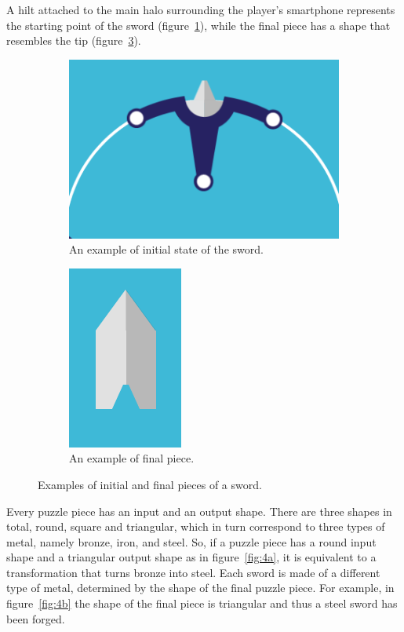 A hilt attached to the main halo surrounding the player’s smartphone represents the starting point of the sword (figure~\ref{fig:3a}), while the final piece has a shape that resembles the tip (figure~\ref{fig:3b}).

\begin{figure}[ht!] 
  \begin{subfigure}[t]{0.48\linewidth}
    \centering
    \includegraphics[width=0.75\linewidth]{images/c5/hilt.png} 
    \caption{An example of initial state of the sword.}\label{fig:3a}
  \end{subfigure}\hfill
  \begin{subfigure}[t]{0.48\linewidth}
    \centering
    \includegraphics[width=0.35\linewidth]{images/c5/final-piece.png} 
    \caption{An example of final piece.}\label{fig:3b}
  \end{subfigure}
  \caption{Examples of initial and final pieces of a sword.}
\end{figure}

Every puzzle piece has an input and an output shape. There are three shapes in total, round, square and triangular, which in turn correspond to three types of metal, namely bronze, iron, and steel. So, if a puzzle piece has a round input shape and a triangular output shape as in figure~\ref{fig:4a}, it is equivalent to a transformation that turns bronze into steel. Each sword is made of a different type of metal, determined by the shape of the final puzzle piece. For example, in figure~\ref{fig:4b} the shape of the final piece is triangular and thus a steel sword has been forged.

